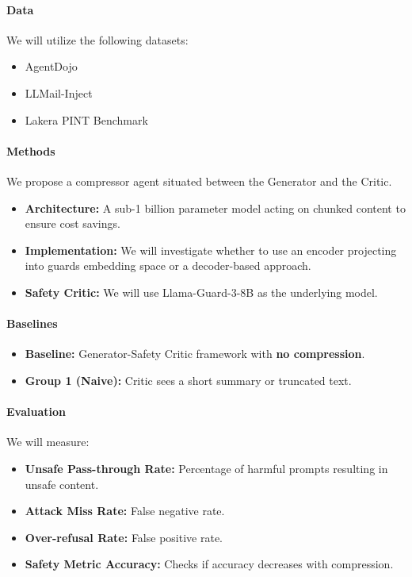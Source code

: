 \documentclass[11pt]{article}
\begin{document}
\paragraph{Data}
We will utilize the following datasets:
\begin{itemize}
    \item AgentDojo
    \item LLMail-Inject
    \item Lakera PINT Benchmark
\end{itemize}

\paragraph{Methods}
We propose a compressor agent situated between the Generator and the Critic.
\begin{itemize}
    \item \textbf{Architecture:} A sub-1 billion parameter model acting on chunked content to ensure cost savings.
    \item \textbf{Implementation:} We will investigate whether to use an encoder projecting into guards embedding space or a decoder-based approach.
    \item \textbf{Safety Critic:} We will use Llama-Guard-3-8B as the underlying model.
\end{itemize}

\paragraph{Baselines}
\begin{itemize}
    \item \textbf{Baseline:} Generator-Safety Critic framework with \textbf{no compression}.
    \item \textbf{Group 1 (Naive):} Critic sees a short summary or truncated text.
\end{itemize}

\paragraph{Evaluation}
We will measure:
\begin{itemize}
    \item \textbf{Unsafe Pass-through Rate:} Percentage of harmful prompts resulting in unsafe content.
    \item \textbf{Attack Miss Rate:} False negative rate.
    \item \textbf{Over-refusal Rate:} False positive rate.
    \item \textbf{Safety Metric Accuracy:} Checks if accuracy decreases with compression.
\end{itemize}
\end{document}
